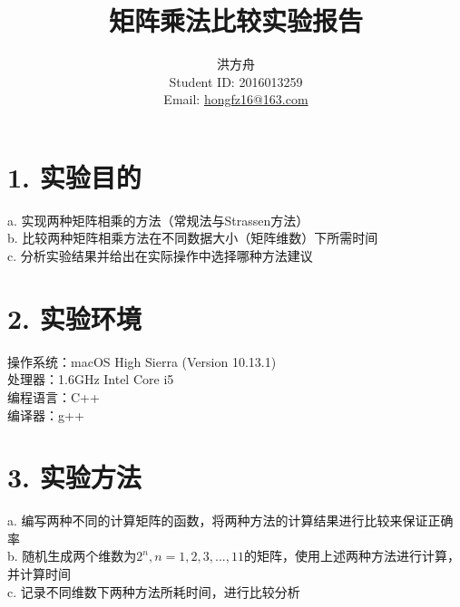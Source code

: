 \documentclass[12pt]{article}
\title{矩阵乘法比较实验报告}
\author{洪方舟\\Student ID: 2016013259\\Email: \href{mailto:hongfz16@163.com}{hongfz16@163.com}}
\begin{document}
  \maketitle
  \section*{1. 实验目的}
  a. 实现两种矩阵相乘的方法（常规法与Strassen方法）\\
  b. 比较两种矩阵相乘方法在不同数据大小（矩阵维数）下所需时间\\
  c. 分析实验结果并给出在实际操作中选择哪种方法建议
  \section*{2. 实验环境}
  操作系统：macOS High Sierra (Version 10.13.1)\\
  处理器：1.6GHz Intel Core i5\\
  编程语言：C++\\
  编译器：g++
  \section*{3. 实验方法}
  a. 编写两种不同的计算矩阵的函数，将两种方法的计算结果进行比较来保证正确率\\
  b. 随机生成两个维数为$2^n, n=1,2,3,...,11$的矩阵，使用上述两种方法进行计算，并计算时间\\
  c. 记录不同维数下两种方法所耗时间，进行比较分析
  \newpage
\end{document}
